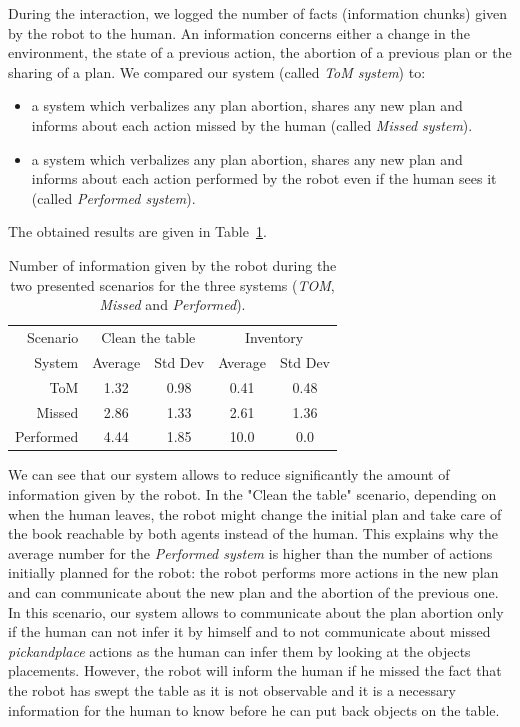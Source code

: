 \documentclass[english,a4paper,11pt,twoside]{StyleThese}
\begin{document}
During the interaction, we logged the number of facts (information chunks) given by the robot to the human. An information concerns either a change in the environment, the state of a previous action, the abortion of a previous plan or the sharing of a plan. We compared our system (called \textit{ToM system}) to:
\begin{itemize}
\item a system which verbalizes any plan abortion, shares any new plan and informs about each action missed by the human (called \textit{Missed system}).
\item a system which verbalizes any plan abortion, shares any new plan and informs about each action performed by the robot even if the human sees it (called \textit{Performed system}).
\end{itemize}

The obtained results are given in Table~\ref{table:results}.

\begin{table}[ht]
\begin{center}
\begin{tabular}{|r||c|c||c|c|}
\hline
 Scenario & \multicolumn{2}{c||}{Clean the table} & \multicolumn{2}{c|}{Inventory}\\
\cline{2-5} 
System & Average & Std Dev & Average & Std Dev\\
\hline
\hline
ToM & 1.32 & 0.98 & 0.41 & 0.48\\
\hline
Missed & 2.86 & 1.33 & 2.61 & 1.36\\
\hline
Performed & 4.44 & 1.85 & 10.0 & 0.0\\
\hline
\end{tabular}
\end{center}
\caption{Number of information given by the robot during the two presented scenarios for the three systems (\textit{TOM}, \textit{Missed} and \textit{Performed}).}
\label{table:results}
\end{table}

We can see that our system allows to reduce significantly the amount of information given by the robot. In the "Clean the table" scenario, depending on when the human leaves, the robot might change the initial plan and take care of the book reachable by both agents instead of the human. This explains why the average number for the \textit{Performed system} is higher than the number of actions initially planned for the robot: the robot performs more actions in the new plan and can communicate about the new plan and the abortion of the previous one. In this scenario, our system allows to communicate about the plan abortion only if the human can not infer it by himself and to not communicate about missed \textit{pickandplace} actions as the human can infer them by looking at the objects placements. However, the robot will inform the human if he missed the fact that the robot has swept the table as it is not observable and it is a necessary information for the human to know before he can put back objects on the table.
\end{document}
